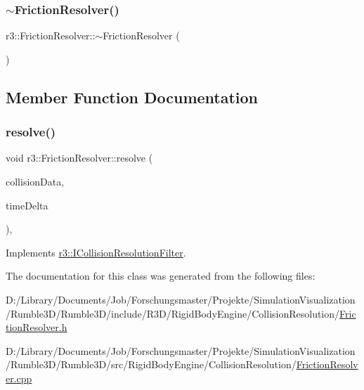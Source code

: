 \subsubsection{\texorpdfstring{$\sim$\+Friction\+Resolver()}{~FrictionResolver()}}
{\footnotesize\ttfamily r3\+::\+Friction\+Resolver\+::$\sim$\+Friction\+Resolver (\begin{DoxyParamCaption}{ }\end{DoxyParamCaption})\hspace{0.3cm}{\ttfamily [default]}}



\subsection{Member Function Documentation}
\mbox{\label{classr3_1_1_friction_resolver_af26a84959e95749088f713176ec3c096}} 
\subsubsection{\texorpdfstring{resolve()}{resolve()}}
{\footnotesize\ttfamily void r3\+::\+Friction\+Resolver\+::resolve (\begin{DoxyParamCaption}\item[{\mbox{\hyperlink{classr3_1_1_collision_data}{Collision\+Data}} \&}]{collision\+Data,  }\item[{\mbox{\hyperlink{namespacer3_ab2016b3e3f743fb735afce242f0dc1eb}{real}}}]{time\+Delta }\end{DoxyParamCaption})\hspace{0.3cm}{\ttfamily [override]}, {\ttfamily [virtual]}}



Implements \mbox{\hyperlink{classr3_1_1_i_collision_resolution_filter_a87ef2579e2acaaadef4cd8f9a20005ce}{r3\+::\+I\+Collision\+Resolution\+Filter}}.



The documentation for this class was generated from the following files\+:\begin{DoxyCompactItemize}
\item 
D\+:/\+Library/\+Documents/\+Job/\+Forschungsmaster/\+Projekte/\+Simulation\+Visualization/\+Rumble3\+D/\+Rumble3\+D/include/\+R3\+D/\+Rigid\+Body\+Engine/\+Collision\+Resolution/\mbox{\hyperlink{_friction_resolver_8h}{Friction\+Resolver.\+h}}\item 
D\+:/\+Library/\+Documents/\+Job/\+Forschungsmaster/\+Projekte/\+Simulation\+Visualization/\+Rumble3\+D/\+Rumble3\+D/src/\+Rigid\+Body\+Engine/\+Collision\+Resolution/\mbox{\hyperlink{_friction_resolver_8cpp}{Friction\+Resolver.\+cpp}}\end{DoxyCompactItemize}
